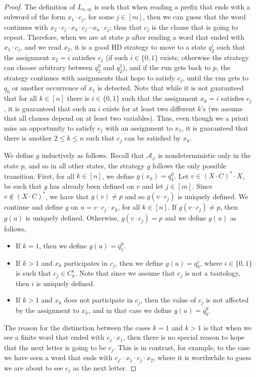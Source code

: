 \documentclass[10pt,a4paper]{amsart}
\theoremstyle{definition}
\numberwithin{equation}{section}
\newcommand{\A}{{\mathcal A}}
\begin{document}
\begin{proof}
	The definition of $L_{n,m}$ is such that when reading a prefix that ends with a subword of the form $x_1\cdot c_j$, for some $j\in [m]$,  then we can guess that the word continues with $x_2\cdot c_j \cdot x_3 \cdot c_j \cdots x_n\cdot c_j$; thus that $c_j$ is the clause that is going to repeat. Therefore, when we are at state $p$ after reading a word that ended with $x_1 \cdot c_j$, and we read $x_2$, it is a good HD strategy to move to a state $q^i_2$ such that the assignment $x_2=i$ satisfies $c_j$ (if such $i\in \{0,1\}$ exists; otherwise the strategy can choose arbitrary between $q^0_2$ and $q^1_2$), and if the run gets back to $p$, the strategy continues with assignments that hope to satisfy $c_j$, until the run gets to $q_0$ or another occurrence of $x_1$ is detected. Note that while it is not guaranteed that for all $k\in [n]$ there is $i\in \{0,1\}$ such that the assignment $x_k=i$ satisfies $c_j$, it is guaranteed that such an $i$ exists for at least two different $k$'s (we assume that all clauses depend on at least two variables). Thus, even though we a priori miss an opportunity to satisfy $c_j$  with an assignment to $x_1$, it is guaranteed that there is another $2\leq k\leq n$ such that $c_j$ can be satisfied by $x_k$. 
	 
	We define $g$ inductively as follows. Recall that $\A_\varphi$ is nondeterministic only in the state $p$, and so in all other states, the strategy $g$ follows the only possible transition. First, for all $k\in [n]$, we define $g(x_k)=q^0_k$. Let $v\in (X\cdot C)^*\cdot X$, be such that $g$ has already been defined on $v$ and let $j\in [m]$. Since $v\notin (X\cdot C)^*$, we have that $g(v)\neq p$ and so $g(v\cdot c_j)$ is uniquely defined. We continue and define $g$ on $u=v\cdot c_j\cdot x_k$, for all $k\in [n]$. If $g(v\cdot c_j)\neq p$, then $g(u)$ is uniquely defined. Otherwise, $g(v\cdot c_j)= p$ and we define $g(u)$ as follows,
	\begin{itemize}
		\item If $k=1$, then we define $g(u)=q^0_1$.
		\item If $k>1$ and $x_k$ participates in $c_j$, then we define $g(u)=q^i_k$, where $i\in \{0,1\}$ is such that $c_j\in C^i_k$. Note that since we assume that $c_j$ is not a tautology, then $i$ is uniquely defined.
		\item If $k>1$ and $x_k$ does not participate in $c_j$, then the value of $c_j$ is not affected by the assignment to $x_k$, and in that case we define $g(u)=q^0_k$.
	\end{itemize}
	\noindent %
	The reason for the distinction between the cases $k=1$ and $k>1$ is that when we see a finite word that ended with $c_j\cdot x_1$, then there is no special reason to hope that the next letter is going to be $c_j$. This is in contrast, for example, to the case we have seen a word that ends with $c_{j'}\cdot x_1\cdot c_j\cdot x_2$, where it is worthwhile to guess we are about to see $c_j$ as the next letter. 
	

\end{proof}
\end{document}
